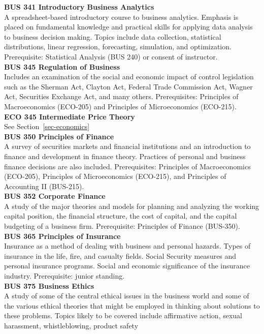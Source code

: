 \documentclass[
  letterpaper,
]{scrbook}
\begin{document}
\textbf{BUS 341 Introductory Business Analytics}\\
A spreadsheet-based introductory course to business analytics. Emphasis
is placed on fundamental knowledge and practical skills for applying
data analysis to business decision making. Topics include data
collection, statistical distributions, linear regression, forecasting,
simulation, and optimization. Prerequisite: Statistical Analysis (BUS
240) or consent of instructor.\\
\textbf{BUS 345 Regulation of Business}\\
Includes an examination of the social and economic impact of control
legislation such as the Sherman Act, Clayton Act, Federal Trade
Commission Act, Wagner Act, Securities Exchange Act, and many others.
Prerequisites: Principles of Macroeconomics (ECO-205) and Principles of
Microeconomics (ECO-215).\\
\textbf{ECO 345 Intermediate Price Theory}\\
See Section~\ref{sec-economics}\\
\textbf{BUS 350 Principles of Finance}\\
A survey of securities markets and financial institutions and an
introduction to finance and development in finance theory. Practices of
personal and business finance decisions are also included.
Prerequisites: Principles of Macroeconomics (ECO-205), Principles of
Microeconomics (ECO-215), and Principles of Accounting II (BUS-215).\\
\textbf{BUS 352 Corporate Finance}\\
A study of the major theories and models for planning and analyzing the
working capital position, the financial structure, the cost of capital,
and the capital budgeting of a business firm. Prerequisite: Principles
of Finance (BUS-350).\\
\textbf{BUS 365 Principles of Insurance}\\
Insurance as a method of dealing with business and personal hazards.
Types of insurance in the life, fire, and casualty fields. Social
Security measures and personal insurance programs. Social and economic
significance of the insurance industry. Prerequisite: junior standing.\\
\textbf{BUS 375 Business Ethics}\\
A study of some of the central ethical issues in the business world and
some of the various ethical theories that might be employed in thinking
about solutions to these problems. Topics likely to be covered include
affirmative action, sexual harassment, whistleblowing, product safety
\end{document}
